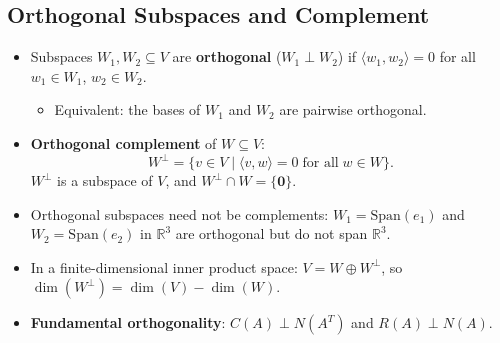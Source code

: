 \documentclass[hidelinks]{article}
\begin{document}
\subsection{Orthogonal Subspaces and Complement}
\begin{itemize}
    \item Subspaces $W_1, W_2\subseteq V$ are \textbf{orthogonal} ($W_1\perp W_2$) if $\langle w_1, w_2\rangle = 0$ for all $w_1\in W_1$, $w_2\in W_2$.
    \begin{itemize}
        \item Equivalent: the bases of $W_1$ and $W_2$ are pairwise orthogonal.
    \end{itemize}
    \item \textbf{Orthogonal complement} of $W\subseteq V$:
    \[
        W^\perp = \{v\in V \mid \langle v,w\rangle = 0 \;\text{for all}\; w\in W\}.
    \]
    $W^\perp$ is a subspace of $V$, and $W^\perp \cap W = \{\mathbf{0}\}$.
    \item Orthogonal subspaces need not be complements: $W_1 = \mathrm{Span}(e_1)$ and $W_2 = \mathrm{Span}(e_2)$ in $\mathbb{R}^3$ are orthogonal but do not span $\mathbb{R}^3$.
    \item In a finite-dimensional inner product space: $V = W \oplus W^\perp$, so $\dim(W^\perp) = \dim(V) - \dim(W)$.
    \item \textbf{Fundamental orthogonality}: $C(A) \perp N(A^T)$ and $R(A) \perp N(A)$.
\end{itemize}
\end{document}
